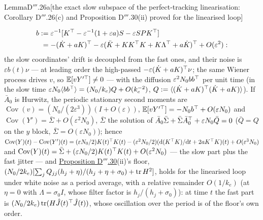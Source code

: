 \begin{thm}{Lemma}{D$'''$.26a}[the exact slow subspace of the perfect-tracking linearisation: Corollary D$'''$.26(c)
and Proposition D$'''$.30(ii) proved for the linearised loop]
\begin{enumerate}[label=\textup{(\roman*)}]
\begin{align*}
      b &:= \varepsilon^{-1}[K^\top - \varepsilon^{-1}(1 + \varepsilon a)S - \varepsilon SPK^\top]\\
      &\phantom{:}= -(\dot K + aK)^\top - \varepsilon(\ddot K + KK^\top K + K\Lambda^\top + a\dot K)^\top + O(\varepsilon^2):
    \end{align*}
    the slow coordinates' drift is decoupled from the fast ones, and their noise is $\varepsilon b(t)\nu$ --- at
    leading order the high-passed $-\varepsilon(\dot K + aK)^\top\nu$; the same Wiener process drives $v$, so
    $\mathbb{E}[vY'^\top]\ne0$ --- with the diffusion $\varepsilon^2N_0bb^\top$ per unit time (in the slow time
    $\varepsilon N_0\langle bb^\top\rangle = (N_0/k_e)Q + O(k_e^{-2})$,
    $Q := \langle(\dot K + aK)^\top(\dot K + aK)\rangle$). If $\bar A_0$ is Hurwitz, the periodic stationary second
    moments are $\operatorname{Cov}(v) = (N_0/(2\varepsilon^3))(I + O(\varepsilon))$,
    $\mathbb{E}[vY'^\top] = -N_0b^\top + O(\varepsilon N_0)$ and $\operatorname{Cov}(Y') = \bar\Sigma + O(\varepsilon^2N_0)$,
    $\bar\Sigma$ the solution of $\bar A_0\bar\Sigma + \bar\Sigma\bar A_0^\top + \varepsilon N_0\bar Q = 0$
    ($\bar Q = Q$ on the $y$ block, $\bar\Sigma = O(\varepsilon N_0)$); hence
    $\operatorname{Cov}(Y)(t) - \operatorname{Cov}(Y')(t) = (\varepsilon N_0/2)K(t)^\top K(t)
    - (\varepsilon^2N_0/2)(\mathrm{d}(K^\top K)/\mathrm{d}t + 2aK^\top K)(t) + O(\varepsilon^3N_0)$ and
    $\operatorname{Cov}(Y)(t) = \bar\Sigma + (\varepsilon N_0/2)K(t)^\top K(t) + O(\varepsilon^2N_0)$ --- the slow part
    plus the fast jitter --- and \hyperref[res:thmDppp:30]{Proposition D$'''$.30}(ii)'s floor,
    $(N_0/2k_e)[\sum_jQ_{jj}(h_j + \eta)/(h_j + \eta + \sigma_0) + \operatorname{tr} H^2]$, holds for the linearised loop under
    white noise as a period average, with a relative remainder $O(1/k_e)$ (at $\eta = 0$ with $\Lambda = \sigma_0I$,
    whose filter factor is $h_j/(h_j + \sigma_0)$): at time $t$ the fast part is
    $(N_0/2k_e)\operatorname{tr}(H\hat J(t)^\top\hat J(t))$, whose oscillation over the period is of the floor's own order.
\end{enumerate}
\end{thm}

